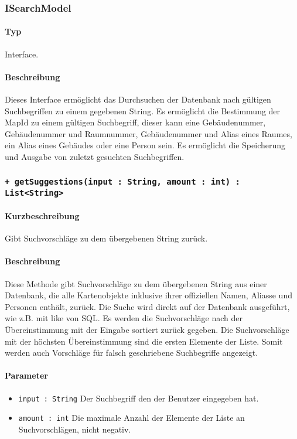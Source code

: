 \subsubsection{ISearchModel}
\paragraph*{Typ}
Interface.
\paragraph*{Beschreibung}
Dieses Interface ermöglicht das Durchsuchen der Datenbank nach gültigen Suchbegriffen zu einem gegebenen String.
Es ermöglicht die Bestimmung der MapId zu einem gültigen Suchbegriff, 
dieser kann eine Gebäudenummer, Gebäudenummer und Raumnummer, Gebäudenummer und Alias eines Raumes, ein Alias eines Gebäudes oder eine Person sein.
Es ermöglicht die Speicherung und Ausgabe von zuletzt gesuchten Suchbegriffen.

 \subsubsection*{\texttt{+ getSuggestions(input : String, amount : int) : List<String>}}%
\paragraph*{Kurzbeschreibung}
Gibt Suchvorschläge zu dem übergebenen String zurück.
\paragraph*{Beschreibung}
Diese Methode gibt Suchvorschläge zu dem übergebenen String aus einer Datenbank, 
die alle Kartenobjekte inklusive ihrer offiziellen Namen, Aliasse und Personen enthält, zurück.
Die Suche wird direkt auf der Datenbank ausgeführt, wie z.B. mit \dq like \dq{} von SQL.
Es werden die Suchvorschläge nach der Übereinstimmung mit der Eingabe sortiert zurück gegeben.
Die Suchvorschläge mit der höchsten Übereinstimmung sind die ersten Elemente der Liste.
Somit werden auch Vorschläge für falsch geschriebene Suchbegriffe angezeigt.
\paragraph*{Parameter}
\begin{itemize}
    \item \texttt{input : String} Der Suchbegriff den der Benutzer eingegeben hat.
    \item \texttt{amount : int} Die maximale Anzahl der Elemente der Liste an Suchvorschlägen, nicht negativ.
\end{itemize}
